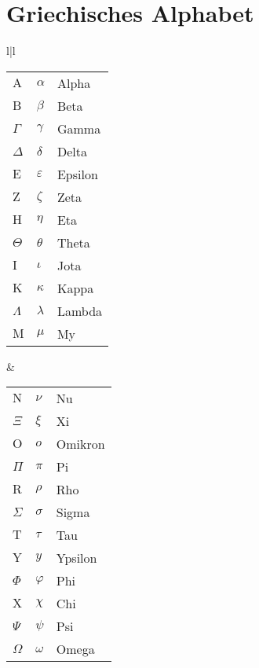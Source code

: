 \documentclass[a4paper,10pt,fleqn,twocolumn,twoside,openany]{book}
\numberwithin{equation}{chapter}
\begin{document}
\newpage
\section{Griechisches Alphabet}

\begin{tabular}{l|l}
\begin{tabular}[t]{lll}
$\mathrm A$ & $\alpha$   & Alpha\\
$\mathrm B$ & $\beta$    & Beta\\
$\Gamma$    & $\gamma$   & Gamma\\
$\Delta$    & $\delta$   & Delta\\
\noalign{\vspace{1em}}
$\mathrm E$ & $\varepsilon$ & Epsilon\\
$\mathrm Z$ & $\zeta$    & Zeta\\
$\mathrm H$ & $\eta$     & Eta\\
$\Theta$    & $\theta$   & Theta\\
\noalign{\vspace{1em}}
$\mathrm I$ & $\iota$    & Jota\\
$\mathrm K$ & $\kappa$   & Kappa\\
$\Lambda$   & $\lambda$  & Lambda\\
$\mathrm M$ & $\mu$      & My
\end{tabular}
&
\begin{tabular}[t]{lll}
$\mathrm N$ & $\nu$      & Nu\\
$\Xi$       & $\xi$      & Xi\\
$\mathrm O$ & $o$        & Omikron\\
$\Pi$       & $\pi$      & Pi\\
\noalign{\vspace{1em}}
$\mathrm R$ & $\rho$     & Rho\\
$\Sigma$    & $\sigma$   & Sigma\\
$\mathrm T$ & $\tau$     & Tau\\
$\mathrm Y$ & $y$        & Ypsilon\\
\noalign{\vspace{1em}}
$\Phi$      & $\varphi$  & Phi\\
$\mathrm X$ & $\chi$     & Chi\\
$\Psi$      & $\psi$     & Psi\\
$\Omega$    & $\omega$   & Omega 
\end{tabular}
\end{tabular}
\end{document}
